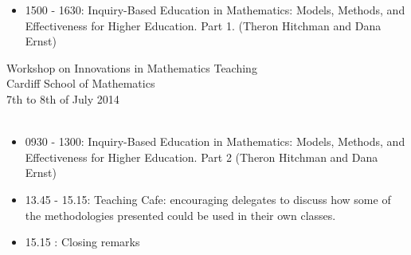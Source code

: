 \documentclass[a4paper]{article}
\begin{document}
\vspace{1cm}

\begin{center}
\end{center}

\begin{itemize}
    \item 1500 - 1630: Inquiry-Based Education in Mathematics: Models, Methods, and Effectiveness for Higher Education. Part 1. (Theron Hitchman and Dana Ernst)
\end{itemize}

\vspace{1cm}

\begin{center}
\end{center}



\newpage

\begin{center}
    {\Huge Workshop on Innovations in Mathematics Teaching}\\
    {\tiny Cardiff School of Mathematics}\\
    {\tiny 7th to 8th of July 2014}\\
    \vspace{1cm}
    {}\\
\end{center}

\vspace{1cm}

\begin{center}
\end{center}

\begin{itemize}
    \item 0930 - 1300: Inquiry-Based Education in Mathematics: Models, Methods, and Effectiveness for Higher Education. Part 2 (Theron Hitchman and Dana Ernst)
\end{itemize}

\vspace{1cm}

\begin{center}
\end{center}

\vspace{1cm}

\begin{center}
\end{center}

\begin{itemize}
    \item 13.45 - 15.15: Teaching Cafe: encouraging delegates to discuss how some of the methodologies presented could be used in their own classes.
    \item 15.15 : Closing remarks
\end{itemize}
\end{document}
